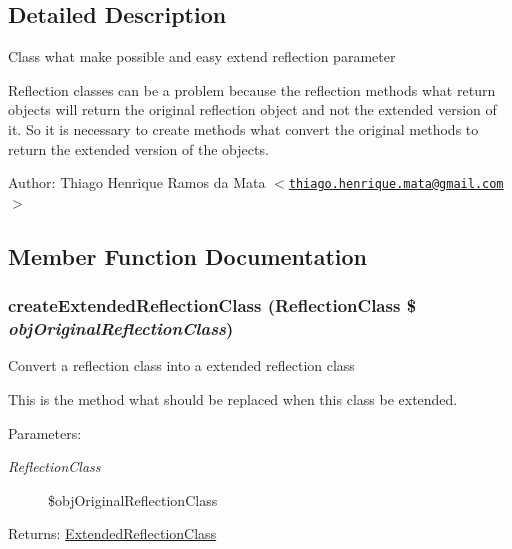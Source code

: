 \subsection{Detailed Description}
Class what make possible and easy extend reflection parameter

Reflection classes can be a problem because the reflection methods what return objects will return the original reflection object and not the extended version of it. So it is necessary to create methods what convert the original methods to return the extended version of the objects.

\begin{Desc}
\item[Author:]Thiago Henrique Ramos da Mata $<$\href{mailto:thiago.henrique.mata@gmail.com}{\tt thiago.henrique.mata@gmail.com}$>$ \end{Desc}


\subsection{Member Function Documentation}
\hypertarget{class_extended_reflection_parameter_6b56ec198bc6a5b5a72076e4e7c19e29}{
\subsubsection[{createExtendedReflectionClass}]{\setlength{\rightskip}{0pt plus 5cm}createExtendedReflectionClass (ReflectionClass \$ {\em objOriginalReflectionClass})}}
\label{class_extended_reflection_parameter_6b56ec198bc6a5b5a72076e4e7c19e29}


Convert a reflection class into a extended reflection class

This is the method what should be replaced when this class be extended.

\begin{Desc}
\item[Parameters:]
\begin{description}
\item[{\em ReflectionClass}]\$objOriginalReflectionClass \end{description}
\end{Desc}
\begin{Desc}
\item[Returns:]\hyperlink{class_extended_reflection_class}{ExtendedReflectionClass} \end{Desc}


